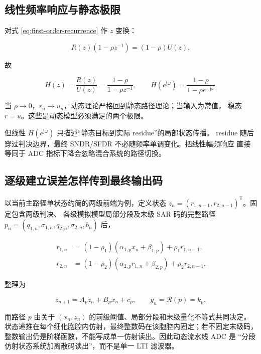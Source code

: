 \documentclass[11pt,a4paper]{ctexart}
\newcommand{\jj}{\mathrm{j}}
\theoremstyle{adcplain}
\theoremstyle{definition}
\begin{document}
\subsection{线性频率响应与静态极限}

对式 \eqref{eq:first-order-recurrence} 作 $z$ 变换：

\begin{equation}
  R(z)(1-\rho z^{-1})=(1-\rho)U(z),
\end{equation}

故

\begin{equation}
  H(z)=\frac{R(z)}{U(z)}
  =\frac{1-\rho}{1-\rho z^{-1}},
  \qquad
  H(e^{\jj\omega})
  =\frac{1-\rho}{1-\rho e^{-\jj\omega}}.
  \label{eq:settling-frequency-response}
\end{equation}

当 $\rho\to0$，$r_n\to u_n$，动态理论严格回到静态路径理论；当输入为常值，
稳态 $r=u$。这些是动态模型必须满足的两个极限。

但线性 $H(e^{\jj\omega})$ 只描述“静态目标到实际 residue”的局部状态传播。
residue 随后穿过判决边界，最终 SNDR/SFDR 不必随频率单调变化。把线性幅频响应
直接等同于 ADC 指标下降会忽略混合系统的路径切换。

\subsection{逐级建立误差怎样传到最终输出码}

以当前主路径单状态约简的两级前端为例，定义状态
$z_n=(r_{1,n-1},r_{2,n-1})^\mathsf T$。固定包含两级判决、
各级模拟模型局部分段及末级 SAR 码的完整路径
$p_n=(q_{1,n},\sigma_{1,n},q_{2,n},\sigma_{2,n},b_n)$ 后，

\begin{align}
  r_{1,n}
  &=(1-\rho_1)
    (\alpha_{1,p}x_n+\beta_{1,p})
    +\rho_1 r_{1,n-1},\\
  r_{2,n}
  &=(1-\rho_2)
    (\alpha_{2,p}r_{1,n}+\beta_{2,p})
    +\rho_2 r_{2,n-1}.
\end{align}

整理为

\begin{equation}
  z_{n+1}
  =
  A_p z_n+B_p x_n+c_p,
  \qquad
  y_n=\mathcal R(p)=k_p,
  \label{eq:pwa-dynamic-state}
\end{equation}

而路径 $p$ 由关于 $(x_n,z_n)$ 的前级阈值、局部分段和末级量化不等式共同决定。
状态递推在每个细化胞腔内仿射，最终整数码在该胞腔内固定；若不固定末级码，
整数输出仍是阶梯函数，不能写成单一仿射读出。因此动态流水线 ADC 是
“分段仿射状态系统加离散码读出”，而不是单一 LTI 滤波器。
\end{document}
